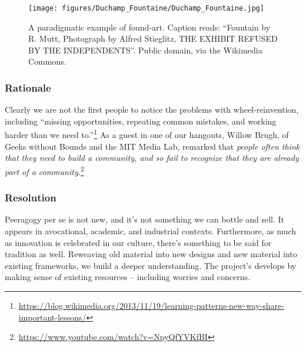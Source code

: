 \begin{wrapfigure}{l}{.42\textwidth}
\vspace{-.2cm}
\begin{center}
\texttt{[image: figures/Duchamp\_Fountaine/Duchamp\_Fountaine.jpg]}
\end{center}
\caption{A paradigmatic example of found-art. Caption reads: ``Fountain by R. Mutt, Photograph by Alfred Stieglitz, THE EXHIBIT REFUSED BY THE INDEPENDENTS''. Public domain, via the Wikimedia Commons.\label{fountain}}
\vspace{-.6cm}
\end{wrapfigure}


\subsubsection*{Rationale} 
Clearly we are not the first people to notice the problems with wheel-reinvention, including ``missing opportunities, repeating common mistakes, and working harder than we need to.''\footnote{\url{https://blog.wikimedia.org/2013/11/19/learning-patterns-new-way-share-important-lessons/}}  As a guest in one of our hangouts, Willow Brugh, of Geeks without Bounds and the MIT Media Lab, remarked that \emph{people often think that they need to build a community, and so fail to recognize that they are already part of a community.}\footnote{\url{https://www.youtube.com/watch?v=NpyQfYVKfBI}}

\subsubsection*{Resolution}  Peeragogy per se is not new, and it's not something we can bottle and sell. It appears in avocational, academic, and industrial contexts.  Furthermore, as much as innovation is celebrated in our culture, there's something to be said for tradition as well.  Reweaving old material into new designs and new material into existing frameworks, we build a deeper understanding.
%
The project's  develops by making sense of existing resources -- including worries and concerns.

